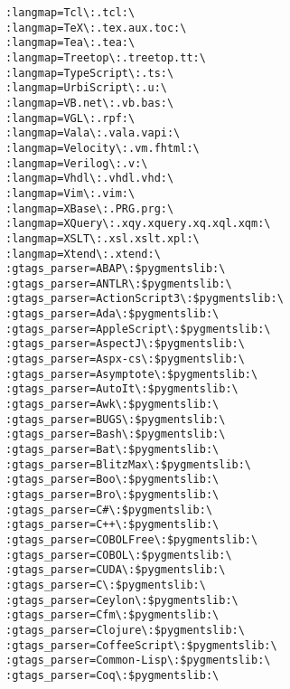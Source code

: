 \documentclass[11pt]{article}
\begin{document}
\begin{lstlisting}
                         :langmap=Tcl\:.tcl:\
                         :langmap=TeX\:.tex.aux.toc:\
                         :langmap=Tea\:.tea:\
                         :langmap=Treetop\:.treetop.tt:\
                         :langmap=TypeScript\:.ts:\
                         :langmap=UrbiScript\:.u:\
                         :langmap=VB.net\:.vb.bas:\
                         :langmap=VGL\:.rpf:\
                         :langmap=Vala\:.vala.vapi:\
                         :langmap=Velocity\:.vm.fhtml:\
                         :langmap=Verilog\:.v:\
                         :langmap=Vhdl\:.vhdl.vhd:\
                         :langmap=Vim\:.vim:\
                         :langmap=XBase\:.PRG.prg:\
                         :langmap=XQuery\:.xqy.xquery.xq.xql.xqm:\
                         :langmap=XSLT\:.xsl.xslt.xpl:\
                         :langmap=Xtend\:.xtend:\
                         :gtags_parser=ABAP\:$pygmentslib:\
                         :gtags_parser=ANTLR\:$pygmentslib:\
                         :gtags_parser=ActionScript3\:$pygmentslib:\
                         :gtags_parser=Ada\:$pygmentslib:\
                         :gtags_parser=AppleScript\:$pygmentslib:\
                         :gtags_parser=AspectJ\:$pygmentslib:\
                         :gtags_parser=Aspx-cs\:$pygmentslib:\
                         :gtags_parser=Asymptote\:$pygmentslib:\
                         :gtags_parser=AutoIt\:$pygmentslib:\
                         :gtags_parser=Awk\:$pygmentslib:\
                         :gtags_parser=BUGS\:$pygmentslib:\
                         :gtags_parser=Bash\:$pygmentslib:\
                         :gtags_parser=Bat\:$pygmentslib:\
                         :gtags_parser=BlitzMax\:$pygmentslib:\
                         :gtags_parser=Boo\:$pygmentslib:\
                         :gtags_parser=Bro\:$pygmentslib:\
                         :gtags_parser=C#\:$pygmentslib:\
                         :gtags_parser=C++\:$pygmentslib:\
                         :gtags_parser=COBOLFree\:$pygmentslib:\
                         :gtags_parser=COBOL\:$pygmentslib:\
                         :gtags_parser=CUDA\:$pygmentslib:\
                         :gtags_parser=C\:$pygmentslib:\
                         :gtags_parser=Ceylon\:$pygmentslib:\
                         :gtags_parser=Cfm\:$pygmentslib:\
                         :gtags_parser=Clojure\:$pygmentslib:\
                         :gtags_parser=CoffeeScript\:$pygmentslib:\
                         :gtags_parser=Common-Lisp\:$pygmentslib:\
                         :gtags_parser=Coq\:$pygmentslib:\

\end{lstlisting}
\end{document}
